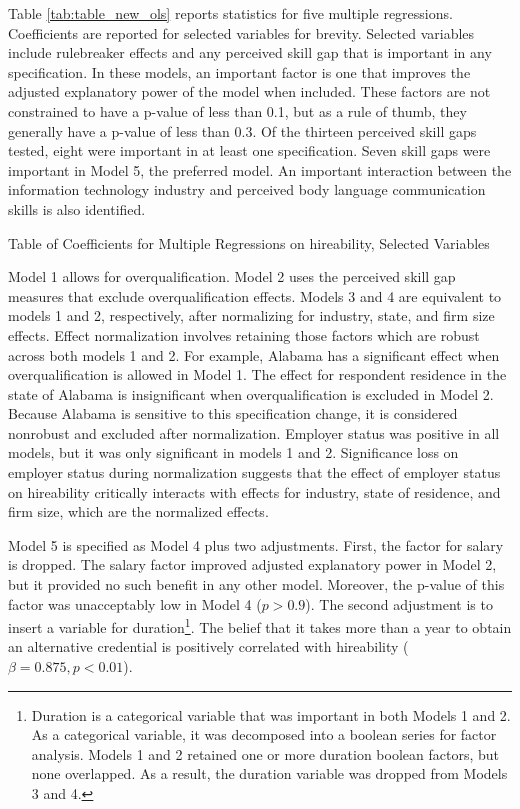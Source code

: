 \documentclass[review]{elsarticle}
\begin{document}
Table \ref{tab:table_new_ols} reports statistics for five multiple regressions.
Coefficients are reported for selected variables for brevity.
Selected variables include rulebreaker effects and any perceived skill gap that is important in any specification.
In these models, an important factor is one that improves the adjusted explanatory power of the model when included.
These factors are not constrained to have a p-value of less than 0.1, but as a rule of thumb, they generally have a p-value of less than 0.3.
Of the thirteen perceived skill gaps tested, eight were important in at least one specification.
Seven skill gaps were important in Model 5, the preferred model.
An important interaction between the information technology industry and perceived body language communication skills is also identified.

\begin{table}
    \caption{Table of Coefficients for Multiple Regressions on hireability, Selected Variables}
    \resizebox{\columnwidth}{!}{
        
    }
    \label{tab:table_new_ols}
\end{table}

Model 1 allows for overqualification.
Model 2 uses the perceived skill gap measures that exclude overqualification effects.
Models 3 and 4 are equivalent to models 1 and 2, respectively, after normalizing for industry, state, and firm size effects.
Effect normalization involves retaining those factors which are robust across both models 1 and 2.
For example, Alabama has a significant effect when overqualification is allowed in Model 1.
The effect for respondent residence in the state of Alabama is insignificant when overqualification is excluded in Model 2.
Because Alabama is sensitive to this specification change, it is considered nonrobust and excluded after normalization.
Employer status was positive in all models, but it was only significant in models 1 and 2.
Significance loss on employer status during normalization
suggests that the effect of employer status on hireability critically interacts with effects for industry,
state of residence, and firm size, which are the normalized effects.

Model 5 is specified as Model 4 plus two adjustments.
First, the factor for salary is dropped.
The salary factor improved adjusted explanatory power in Model 2, but it provided no such benefit in any other model.
Moreover, the p-value of this factor was unacceptably low in Model 4 ($p > 0.9$).
The second adjustment is to insert a variable for duration\footnote{
    Duration is a categorical variable that was important in both Models 1 and 2.
    As a categorical variable, it was decomposed into a boolean series for factor analysis.
    Models 1 and 2 retained one or more duration boolean factors, but none overlapped.
    As a result, the duration variable was dropped from Models 3 and 4.
}.
The belief that it takes more than a year to obtain an alternative credential
is positively correlated with hireability ($\beta = 0.875, p < 0.01$).
\end{document}
